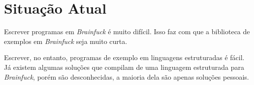 %
%
% 
%

\chapter{Situação Atual}
\noindent
Escrever programas em \textit{Brainfuck} é muito difícil. Isso faz com que a biblioteca de exemplos em \textit{Brainfuck} seja muito curta.

Escrever, no entanto, programas de exemplo em linguagens estruturadas é fácil. Já existem algumas soluções que compilam de uma linguagem estruturada para \textit{Brainfuck}, porém são desconhecidas, a maioria dela são apenas soluções pessoais.


